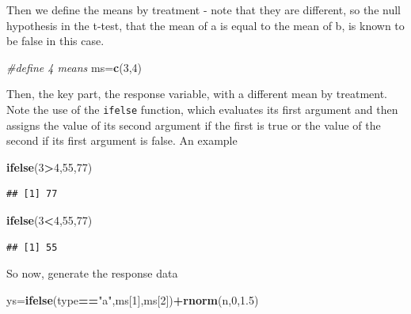 \documentclass[
]{book}
\newenvironment{Shaded}{\begin{snugshade}}{\end{snugshade}}
\newcommand{\CommentTok}[1]{\textcolor[rgb]{0.56,0.35,0.01}{\textit{#1}}}
\newcommand{\DecValTok}[1]{\textcolor[rgb]{0.00,0.00,0.81}{#1}}
\newcommand{\FloatTok}[1]{\textcolor[rgb]{0.00,0.00,0.81}{#1}}
\newcommand{\KeywordTok}[1]{\textcolor[rgb]{0.13,0.29,0.53}{\textbf{#1}}}
\newcommand{\NormalTok}[1]{#1}
\newcommand{\OperatorTok}[1]{\textcolor[rgb]{0.81,0.36,0.00}{\textbf{#1}}}
\newcommand{\StringTok}[1]{\textcolor[rgb]{0.31,0.60,0.02}{#1}}
\begin{document}
Then we define the means by treatment - note that they are different, so the null hypothesis in the t-test, that the mean of a is equal to the mean of b, is known to be false in this case.

\begin{Shaded}
\begin{Highlighting}[]
\CommentTok{#define 4 means}
\NormalTok{ms=}\KeywordTok{c}\NormalTok{(}\DecValTok{3}\NormalTok{,}\DecValTok{4}\NormalTok{)}
\end{Highlighting}
\end{Shaded}

Then, the key part, the response variable, with a different mean by treatment. Note the use of the \texttt{ifelse} function, which evaluates its first argument and then assigns the value of its second argument if the first is true or the value of the second if its first argument is false. An example

\begin{Shaded}
\begin{Highlighting}[]
\KeywordTok{ifelse}\NormalTok{(}\DecValTok{3}\OperatorTok{>}\DecValTok{4}\NormalTok{,}\DecValTok{55}\NormalTok{,}\DecValTok{77}\NormalTok{)}
\end{Highlighting}
\end{Shaded}

\begin{verbatim}
## [1] 77
\end{verbatim}

\begin{Shaded}
\begin{Highlighting}[]
\KeywordTok{ifelse}\NormalTok{(}\DecValTok{3}\OperatorTok{<}\DecValTok{4}\NormalTok{,}\DecValTok{55}\NormalTok{,}\DecValTok{77}\NormalTok{)}
\end{Highlighting}
\end{Shaded}

\begin{verbatim}
## [1] 55
\end{verbatim}

So now, generate the response data

\begin{Shaded}
\begin{Highlighting}[]
\NormalTok{ys=}\KeywordTok{ifelse}\NormalTok{(type}\OperatorTok{==}\StringTok{"a"}\NormalTok{,ms[}\DecValTok{1}\NormalTok{],ms[}\DecValTok{2}\NormalTok{])}\OperatorTok{+}\KeywordTok{rnorm}\NormalTok{(n,}\DecValTok{0}\NormalTok{,}\FloatTok{1.5}\NormalTok{)}
\end{Highlighting}
\end{Shaded}
\end{document}
